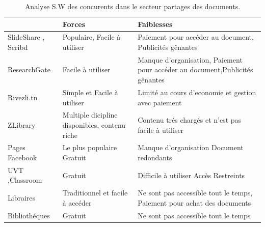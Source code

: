 \documentclass[12pt]{report}
\begin{document}
\begin{table}[h!]
\begin{center}
\begin{tabular}{ | m{3cm} | m{6cm}| m{6cm} |} 
 \hline
   & Forces & Faiblesses \\ 
 \hline
 SlideShare \cite{70}, Scribd \cite{71} & Populaire, Facile à utiliser & Paiement pour accéder au
  document, Publicités gênantes \\ 
 \hline
 ResearchGate \cite{72} & Facile à utiliser & Manque d’organisation, Paiement pour accéder au document,Publicités gênantes \\ 
  \hline
 Rivezli.tn \cite{68}& Simple et Facile à utiliser & Limité au cours d'economie et gestion avec paiement \\ 
 \hline
  ZLibrary \cite{69} & Multiple dicipline disponibles, contenu riche & Contenu trés chargés et n'est pas facile à utiliser \\ 
 \hline
 Pages Facebook \cite{66} & Le plus populaire Gratuit & Manque d’organisation Document redondants \\ 
 \hline
 UVT \cite{73},Classroom \cite{67} & Gratuit & Difficile à utiliser Accès Restreints \\ 
 \hline
 Libraires & Traditionnel et facile à accéder & Ne sont pas accessible tout le temps, Paiement pour achat des documents \\ 
 \hline
 Bibliothéques & Gratuit & Ne sont pas accessible tout le temps \\ 
 \hline
\end{tabular}
\caption{Analyse S.W des concurents dans le secteur partages des documents.}
\label{table:documentanalyse}
\end{center}
\end{table}
\end{document}
